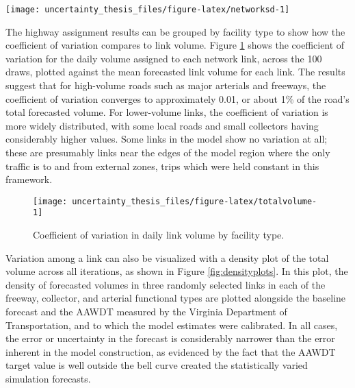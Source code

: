 \documentclass[fancy, masters, twoside]{byuthesis}
\begin{document}
\begin{sidewaysfigure}

{\centering \texttt{[image: uncertainty\_thesis\_files/figure-latex/networksd-1]} 

}

\caption{Standard deviation in daily forecasted volume.}\label{fig:networksd}
\end{sidewaysfigure}

The highway assignment results can be grouped by facility type to show how the coefficient of variation compares to link volume. Figure \ref{fig:totalvolume} shows the coefficient of variation for the daily volume assigned to each network link, across the 100 draws, plotted against the mean forecasted link volume for each link. The results suggest that for high-volume roads such as major arterials and freeways, the coefficient of variation converges to approximately 0.01, or about 1\% of the road's total forecasted volume. For lower-volume links, the coefficient of variation is more widely distributed, with some local roads and small collectors having considerably higher values. Some links in the model show no variation at all; these are presumably links near the edges of the model region where the only traffic is to and from external zones, trips which were held constant in this framework.

\begin{figure}

{\centering \texttt{[image: uncertainty\_thesis\_files/figure-latex/totalvolume-1]} 

}

\caption{Coefficient of variation in daily link volume by facility type.}\label{fig:totalvolume}
\end{figure}

Variation among a link can also be visualized with a density plot of the total volume across all iterations, as shown in Figure \ref{fig:densityplots}. In this plot, the density of forecasted volumes in three randomly selected links in each of the freeway, collector, and arterial functional types are plotted alongside the baseline forecast and the AAWDT measured by the Virginia Department of Transportation, and to which the model estimates were calibrated. In all cases, the error or uncertainty in the forecast is considerably narrower than the error inherent in the model construction, as evidenced by the fact that the AAWDT target value is well outside the bell curve created the statistically varied simulation forecasts.
\end{document}
